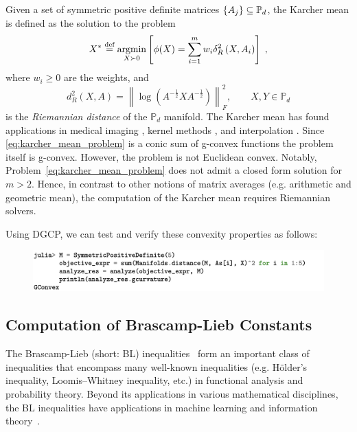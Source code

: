 \documentclass[twoside,11pt]{article}
\begin{document}
Given a set of symmetric positive definite matrices $\{A_j\} \subseteq \mathbb{P}_d$, the Karcher mean is defined as the solution to the problem
\begin{equation}\label{eq:karcher_mean_problem}
    X^* \stackrel{\text{def}}{=} \underset{X \succ 0}{\operatorname{argmin}}\left[\phi(X)=\sum_{i=1}^m w_i \delta_R^2\left(X, A_i\right)\right] \; ,
\end{equation}
where $w_i \geq 0$ are the weights, and 
\begin{equation}
    d^2_R(X, A) = \left \| \log \left(A^{-\frac{1}{2}}X A^{-\frac{1}{2}} \right)\right \|_F^2,
    \qquad X,Y \in \mathbb{P}_d
\end{equation}
is the \textit{Riemannian distance} of the $\mathbb{P}_d$ manifold. The Karcher mean has found applications in medical imaging \citep{Carmichael2013-wq}, kernel methods \citep{clustering}, and interpolation \citep{absil_interpolation}. Since \eqref{eq:karcher_mean_problem} is a conic sum of g-convex functions the problem itself is g-convex. However, the problem is not Euclidean convex. Notably, Problem~\ref{eq:karcher_mean_problem} does not admit a closed form solution for $m>2$. Hence, in contrast to other notions of matrix averages (e.g. arithmetic and geometric mean), the computation of the Karcher mean requires Riemannian solvers.

Using DGCP, we can test and verify these convexity properties as follows:


\begin{figure}[h!]
    \centering
    \includegraphics[width=\linewidth]{listing/5.png}
\end{figure}


\subsection{Computation of Brascamp-Lieb Constants}
The Brascamp-Lieb (short: BL) inequalities~\citep{BL1,BL2} form an important class of inequalities that encompass many well-known inequalities (e.g.  Hölder's inequality,  Loomis–Whitney inequality, etc.) in functional analysis and probability theory. Beyond its applications in various mathematical disciplines, the BL inequalities have applications in machine learning and information theory~\citep{dvir2016rank,pmlr-v30-Hardt13,carlen2009subadditivity,liu2016smoothing}.
\end{document}
